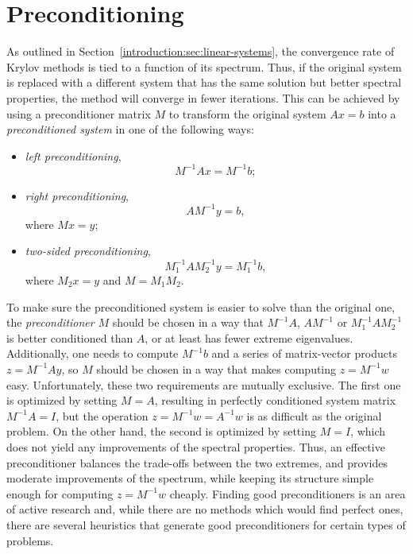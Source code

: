 \section{Preconditioning}

As outlined in Section~\ref{introduction:sec:linear-systems}, the convergence
rate of Krylov methods is tied to a function of its spectrum. Thus, if the
original system is replaced with a different system that has the same solution
but better spectral properties, the method will converge in fewer iterations.
This can be achieved by using a preconditioner matrix $M$ to  transform the
original system $Ax = b$ into a \emph{preconditioned system} in one of the
following ways:
\begin{itemize}
\item \emph{left preconditioning},
\begin{equation}
    M^{-1}Ax = M^{-1}b;
\end{equation}
\item \emph{right preconditioning},
\begin{equation}
    AM^{-1}y = b,
\end{equation}
where $Mx = y$;
\item \emph{two-sided preconditioning},
\begin{equation}
    M_1^{-1}AM_2^{-1} y = M_1^{-1}b,
\end{equation}
where $M_2x = y$ and $M = M_1 M_2$.
\end{itemize}

To make sure the preconditioned system is easier to solve than the original one,
the \emph{preconditioner} $M$ should be chosen in a way that $M^{-1}A$,
$AM^{-1}$ or $M_1^{-1}AM_2^{-1}$ is better conditioned than $A$, or at least has
fewer extreme eigenvalues. Additionally, one needs to compute $M^{-1}b$ and a
series of matrix-vector products $z = M^{-1}Ay$, so $M$ should be chosen in a
way that makes computing $z = M^{-1}w$ easy. Unfortunately, these two
requirements are mutually exclusive. The first one is optimized by setting
$M = A$, resulting in perfectly conditioned system matrix $M^{-1}A = I$, but
the operation $z = M^{-1}w = A^{-1}w$ is as difficult as the original problem.
On the other hand, the second is optimized by setting $M = I$, which does
not yield any improvements of the spectral properties. Thus, an effective
preconditioner balances the trade-offs between the two extremes, and provides
moderate improvements of the spectrum, while keeping its structure simple enough
for computing $z = M^{-1}w$ cheaply. Finding good preconditioners is an area of
active research and, while there are no methods which would find perfect ones,
there are several heuristics that generate good preconditioners for certain
types of problems.

